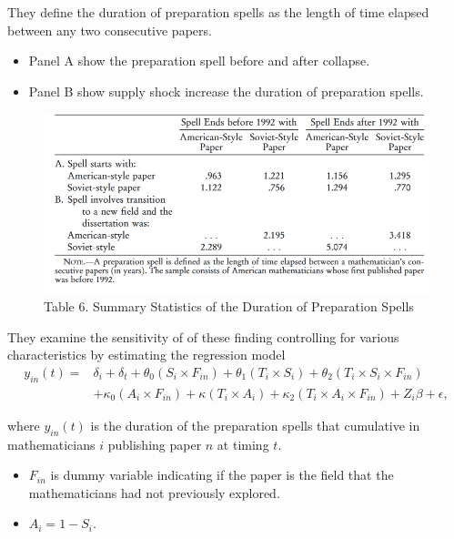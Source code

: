 \documentclass[../root]{subfiles}
\begin{document}
    They define the duration of preparation spells as the length of time elapsed  between any two consecutive papers. 
    
    \begin{itemize}
        \item Panel A show the preparation spell before and after collapse.
        \item Panel B show supply shock increase the duration of preparation spells.
    \end{itemize}
    
    \begin{figure}
        \centering
        \includegraphics[width = \linewidth]{_images/0918sugiyama/Table_6.png}
        \caption{Table 6. Summary Statistics of the Duration of Preparation Spells}
        \label{fig:my_label}
    \end{figure}
    
    They examine the sensitivity of of these finding controlling for various characteristics by estimating the regression model
    \begin{align}
        y_{in} (t) = &\delta_i + \delta_t + \theta_0(S_i \times F_{in}) + \theta_1 (T_i \times S_i) + \theta_2 (T_i \times S_i \times F_{in})  \nonumber \\ 
        &+ \kappa_0 (A_i \times F_{in}) + \kappa(T_i \times A_i) +\kappa_2 (T_i \times A_i \times F_{in}) + Z_i \beta + \epsilon,
    \end{align}
    
    where $y_{in}(t)$  is the duration of the preparation spells that cumulative in mathematicians $i$ publishing paper $n$ at timing $t$.
    \begin{itemize}
        \item $F_{in}$  is dummy variable indicating if the paper is the field that the mathematicians had not previously explored.
        \item $A_i = 1- S_i$.
    \end{itemize}
    
\end{document}
